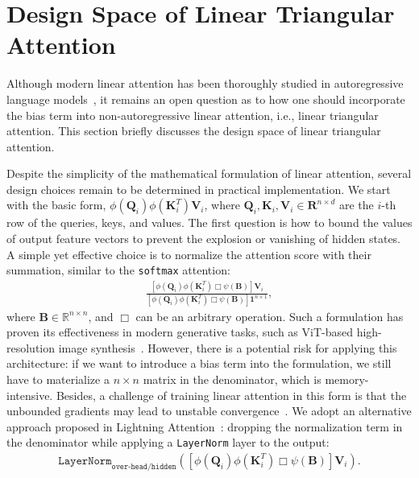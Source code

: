 \section{Design Space of Linear Triangular Attention}

Although modern linear attention has been thoroughly studied in autoregressive language models~\cite{kimiteam2025kimilinearexpressiveefficient,minimax2025minimax01scalingfoundationmodels}, it remains an open question as to how one should incorporate the bias term into non-autoregressive linear attention, i.e., linear triangular attention. This section briefly discusses the design space of linear triangular attention. 

Despite the simplicity of the mathematical formulation of linear attention, several design choices remain to be determined in practical implementation. We start with the basic form, $\phi(\mathbf{Q}_i)\phi(\mathbf{K}_i^T)\mathbf{V}_i$, where $\mathbf{Q}_i, \mathbf{K}_i, \mathbf{V}_i\in\mathbf{R}^{n\times d}$ are the $i$-th row of the queries, keys, and values. The first question is how to bound the values of output feature vectors to prevent the explosion or vanishing of hidden states. A simple yet effective choice is to normalize the attention score with their summation, similar to the \texttt{softmax} attention:
\begin{align}
\frac{\left[\phi(\mathbf{Q}_i)\phi(\mathbf{K}_i^T)\Box\psi(\mathbf{B})\right]\mathbf{V}_i}{\left[\phi(\mathbf{Q}_i)\phi(\mathbf{K}_i^T)\Box\psi(\mathbf{B})\right]\mathbf{1}^{n\times 1}},
\end{align}
where $\mathbf{B}\in\mathbb{R}^{n\times n}$, and $\Box$ can be an arbitrary operation. Such a formulation has proven its effectiveness in modern generative tasks, such as ViT-based high-resolution image synthesis~\cite{xie2023efficient,xie2024sana}. However, there is a potential risk for applying this architecture: if we want to introduce a bias term into the formulation, we still have to materialize a $n\times n$ matrix in the denominator, which is memory-intensive. Besides, a challenge of training linear attention in this form is that the unbounded gradients may lead to unstable convergence~\cite{qin2022devil}. We adopt an alternative approach proposed in Lightning Attention~\cite{qin2024lightning}: dropping the normalization term in the denominator while applying a \texttt{LayerNorm} layer to the output:
\begin{align}
\mathtt{LayerNorm}_{\texttt{over-head/hidden}}\left(\left[\phi(\mathbf{Q}_i)\phi(\mathbf{K}_i^T)\Box\psi(\mathbf{B})\right]\mathbf{V}_i\right).
\end{align}
